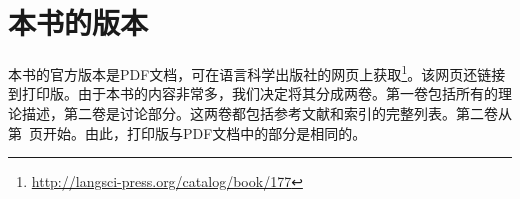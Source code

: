 
\section*{本书的版本}

本书的官方版本是PDF文档，可在语言科学出版社的网页上获取\footnote{%
\url{http://langsci-press.org/catalog/book/177}
}。该网页还链接到打印版。由于本书的内容非常多，我们决定将其分成两卷。第一卷包括所有的理论描述，第二卷是讨论部分。这两卷都包括参考文献和索引的完整列表。第二卷从第~\pageref{part-discussion}页开始。由此，打印版与PDF文档中的部分是相同的。







